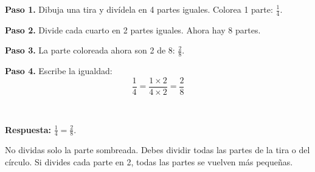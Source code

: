 \begin{wbexample}
\textbf{Paso 1.} Dibuja una tira y divídela en 4 partes iguales. Colorea 1 parte: $\frac{1}{4}$.

\textbf{Paso 2.} Divide cada cuarto en 2 partes iguales. Ahora hay 8 partes.

\textbf{Paso 3.} La parte coloreada ahora son 2 de 8: $\frac{2}{8}$.

\textbf{Paso 4.} Escribe la igualdad:
\[
\frac{1}{4}=\frac{1\times2}{4\times2}=\frac{2}{8}
\]

\begin{center}
\\[2pt]
\end{center}

\textbf{Respuesta:} $\frac{1}{4}=\frac{2}{8}$.
\end{wbexample}

\begin{wbtip}
No dividas solo la parte sombreada. Debes dividir todas las partes de la tira o del círculo. Si divides cada parte en 2, todas las partes se vuelven más pequeñas.
\end{wbtip}

